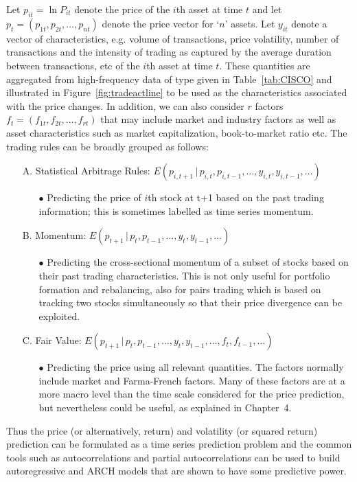 Let $p_{it}= \ln P_{it}$ denote the price of the $i$th asset at time $t$ and let $p_t = (p_{1t},p_{2t},\ldots,p_{nt})$ denote the price vector for `$n$' assets. Let $y_{it}$ denote a vector of characteristics, e.g. volume of transactions, price volatility, number of transactions and the intensity of trading as captured by the average duration between transactions, etc of the $i$th asset at time $t$. These quantities are aggregated from high-frequency data of type given in Table~\ref{tab:CISCO} and illustrated in Figure~\ref{fig:tradeactline} to be used as the characteristics associated with the price changes. In addition, we can also consider $r$ factors $f_t = (f_{1t},f_{2t},\ldots,f_{rt})$ that may include market and industry factors as well as asset characteristics such as market capitalization, book-to-market ratio etc. The trading rules can be broadly grouped as follows:
        \begin{itemize}
        \item[A.] Statistical Arbitrage Rules: $E(p_{i,t+1}\,|\,p_{i,t},p_{i,t-1},\ldots,y_{i,t},y_{i,t-1},\ldots)$
        \begin{itemize}
        \item[$\bullet$] Predicting the price of $i$th stock at t+1 based on the past trading information; this is sometimes labelled as time series momentum.
        \end{itemize}
        \item[B.] Momentum: $E(p_{t+1}\,|\,p_{t},p_{t-1},\ldots,y_{t},y_{t-1},\ldots)$
        \begin{itemize}
        \item[$\bullet$] Predicting the cross-sectional momentum of a subset of stocks based on their past trading characteristics. This is not only useful for portfolio formation and rebalancing, also for pairs trading which is based on tracking two stocks simultaneously so that their price divergence can be exploited. 
        \end{itemize}
        \item[C.] Fair Value: $E(p_{t+1}\,|\,p_{t},p_{t-1},\ldots,y_{t},y_{t-1},\ldots,f_t,f_{t-1},\ldots)$
        \begin{itemize}
        \item[$\bullet$] Predicting the price using all relevant quantities. The factors normally include market and Farma-French factors. Many of these factors are at a more macro level than the time scale considered for the price prediction, but nevertheless could be useful, as explained in Chapter~4.
        \end{itemize}
        \end{itemize}
\noindent Thus the price (or alternatively, return) and volatility (or squared return) prediction can be formulated as a time series prediction problem and the common tools such as autocorrelations and partial autocorrelations can be used to build autoregressive and ARCH models that are shown to have some predictive power. 


